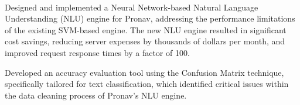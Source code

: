 \documentclass[theme]{cv_einstein}
\begin{document}
\begin{paracol}{2}
\begin{rightcolumn}
{            %



}
            \vspace{\itemspace}\\
            {Designed and implemented a Neural Network-based Natural Language Understanding (NLU) engine for Pronav, addressing the performance limitations of the existing SVM-based engine. The new NLU engine resulted in significant cost savings, reducing server expenses by thousands of dollars per month, and improved request response times by a factor of 100.

Developed an accuracy evaluation tool using the Confusion Matrix technique, specifically tailored for text classification, which identified critical issues within the data cleaning process of Pronav’s NLU engine.

}
\end{rightcolumn}
\end{paracol}
\end{document}
